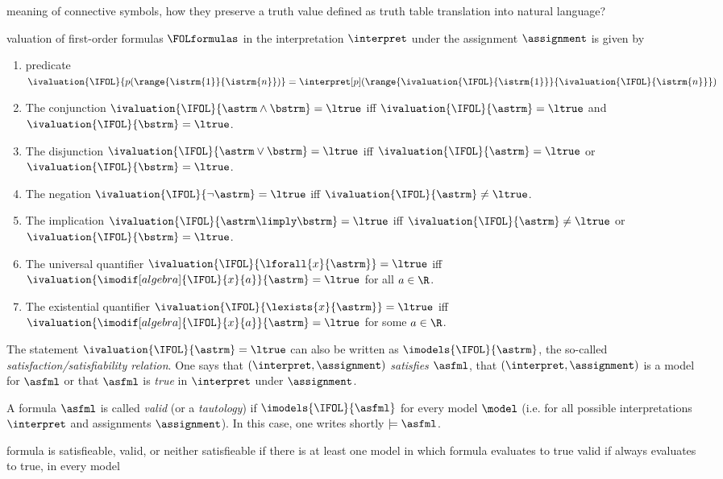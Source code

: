             meaning of connective symbols, how they preserve a truth value
            defined as truth table
            translation into natural language?
            \begin{definition}
                valuation of first-order formulas $\FOLformulas$
                in the interpretation $\interpret$
                under the assignment $\assignment$ is given by
                \begin{enumerate}
                    \item predicate $\ivaluation{\IFOL}{p(\range{\istrm{1}}{\istrm{n}})} = \interpret[p](\range{\ivaluation{\IFOL}{\istrm{1}}}{\ivaluation{\IFOL}{\istrm{n}}})$
                    \item The conjunction $\ivaluation{\IFOL}{\astrm\land\bstrm} = \ltrue$ iff $\ivaluation{\IFOL}{\astrm}=\ltrue$ and $\ivaluation{\IFOL}{\bstrm}=\ltrue$.
                    \item The disjunction $\ivaluation{\IFOL}{\astrm\lor\bstrm} = \ltrue$ iff $\ivaluation{\IFOL}{\astrm}=\ltrue$ or $\ivaluation{\IFOL}{\bstrm}=\ltrue$.
                    \item The negation $\ivaluation{\IFOL}{\lnot\astrm} = \ltrue$ iff $\ivaluation{\IFOL}{\astrm} \neq \ltrue$.
                    \item The implication $\ivaluation{\IFOL}{\astrm\limply\bstrm} = \ltrue$ iff $\ivaluation{\IFOL}{\astrm} \neq \ltrue$ or $\ivaluation{\IFOL}{\bstrm}=\ltrue$.
                    \item The universal quantifier $\ivaluation{\IFOL}{\lforall{x}{\astrm}} = \ltrue$ iff $\ivaluation{\imodif[algebra]{\IFOL}{x}{a}}{\astrm} = \ltrue$ for all $a\in\R$.
                    \item The existential quantifier $\ivaluation{\IFOL}{\lexists{x}{\astrm}} = \ltrue$ iff $\ivaluation{\imodif[algebra]{\IFOL}{x}{a}}{\astrm} = \ltrue$ for some $a\in\R$.
                \end{enumerate}

                The statement $\ivaluation{\IFOL}{\astrm}=\ltrue$ can also be written as $\imodels{\IFOL}{\astrm}$, the so-called \emph{satisfaction/satisfiability relation}.
                One says that $(\interpret,\assignment)$ \emph{satisfies} $\asfml$, that $(\interpret,\assignment)$ is a model for $\asfml$ or that $\asfml$ is \emph{true} in $\interpret$ under $\assignment$.

                A formula $\asfml$ is called \emph{valid} (or a \emph{tautology}) if $\imodels{\IFOL}{\asfml}$ for every model $\model$ (i.e. for all possible interpretations $\interpret$ and assignments $\assignment$). In this case, one writes shortly $\models\asfml$.
            \end{definition}
            formula is satisfieable, valid, or neither
            satisfieable if there is at least one model in which formula evaluates to true
            valid if always evaluates to true, in every model

